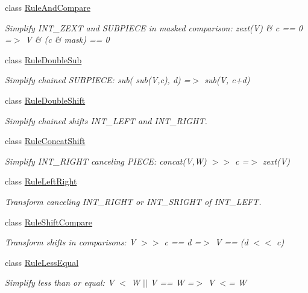 \begin{DoxyCompactItemize}
class \mbox{\hyperlink{class_rule_and_compare}{Rule\+And\+Compare}}
\begin{DoxyCompactList}\small\item\em Simplify I\+N\+T\+\_\+\+Z\+E\+XT and S\+U\+B\+P\+I\+E\+CE in masked comparison\+: {\ttfamily zext(\+V) \& c == 0 =$>$ V \& (c \& mask) == 0} \end{DoxyCompactList}\item 
class \mbox{\hyperlink{class_rule_double_sub}{Rule\+Double\+Sub}}
\begin{DoxyCompactList}\small\item\em Simplify chained S\+U\+B\+P\+I\+E\+CE\+: {\ttfamily sub( sub(\+V,c), d) =$>$ sub(V, c+d)} \end{DoxyCompactList}\item 
class \mbox{\hyperlink{class_rule_double_shift}{Rule\+Double\+Shift}}
\begin{DoxyCompactList}\small\item\em Simplify chained shifts I\+N\+T\+\_\+\+L\+E\+FT and I\+N\+T\+\_\+\+R\+I\+G\+HT. \end{DoxyCompactList}\item 
class \mbox{\hyperlink{class_rule_concat_shift}{Rule\+Concat\+Shift}}
\begin{DoxyCompactList}\small\item\em Simplify I\+N\+T\+\_\+\+R\+I\+G\+HT canceling P\+I\+E\+CE\+: {\ttfamily concat(\+V,\+W) $>$$>$ c =$>$ zext(\+V)} \end{DoxyCompactList}\item 
class \mbox{\hyperlink{class_rule_left_right}{Rule\+Left\+Right}}
\begin{DoxyCompactList}\small\item\em Transform canceling I\+N\+T\+\_\+\+R\+I\+G\+HT or I\+N\+T\+\_\+\+S\+R\+I\+G\+HT of I\+N\+T\+\_\+\+L\+E\+FT. \end{DoxyCompactList}\item 
class \mbox{\hyperlink{class_rule_shift_compare}{Rule\+Shift\+Compare}}
\begin{DoxyCompactList}\small\item\em Transform shifts in comparisons\+: {\ttfamily V $>$$>$ c == d =$>$ V == (d $<$$<$ c)} \end{DoxyCompactList}\item 
class \mbox{\hyperlink{class_rule_less_equal}{Rule\+Less\+Equal}}
\begin{DoxyCompactList}\small\item\em Simplify \textquotesingle{}less than or equal\textquotesingle{}\+: {\ttfamily V $<$ W $\vert$$\vert$ V == W =$>$ V $<$= W} \end{DoxyCompactList}\item 

\end{DoxyCompactItemize}
